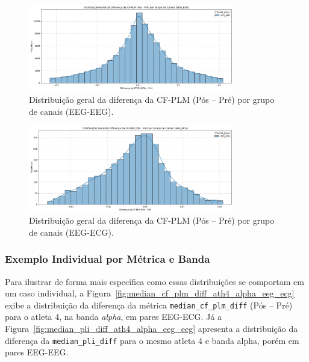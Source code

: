 \begin{figure}[htb]
    \centering
    \includegraphics[width=0.8\textwidth]{figs/6_distribuicao_metricas_conectividade/Distribuição_Geral_da_Diferença_da_CF-PLM_(Pós_-_Pré)_por_Grupo_de_Canais_EEG_EEG.png}
    \caption{Distribuição geral da diferença da CF-PLM (Pós -- Pré) por grupo de canais (EEG-EEG).}
    \label{fig:cf_plm_channel_eeg_eeg}
\end{figure}

\begin{figure}[htb]
    \centering
    \includegraphics[width=0.8\textwidth]{figs/6_distribuicao_metricas_conectividade/Distribuição_Geral_da_Diferença_da_CF-PLM_(Pós_-_Pré)_por_Grupo_de_Canais_EEG_ECG.png}
    \caption{Distribuição geral da diferença da CF-PLM (Pós -- Pré) por grupo de canais (EEG-ECG).}
    \label{fig:cf_plm_channel_eeg_ecg}
\end{figure}

\subsubsection{Exemplo Individual por Métrica e Banda}
Para ilustrar de forma mais específica como essas distribuições se comportam em um caso individual, a Figura~\ref{fig:median_cf_plm_diff_ath4_alpha_eeg_ecg} exibe a distribuição da diferença da métrica \texttt{median\_cf\_plm\_diff} (Pós -- Pré) para o atleta 4, na banda \emph{alpha}, em pares EEG-ECG. Já a Figura~\ref{fig:median_pli_diff_ath4_alpha_eeg_eeg} apresenta a distribuição da diferença da \texttt{median\_pli\_diff} para o mesmo atleta 4 e banda alpha, porém em pares EEG-EEG.

